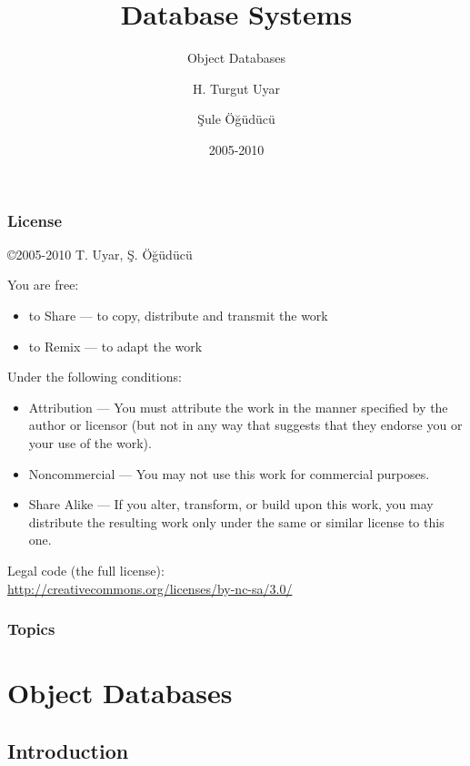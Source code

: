 \documentclass[dvipsnames]{beamer}
\title{Database Systems}
\subtitle{Object Databases}
\author{H. Turgut Uyar \and Şule Öğüdücü}
\date{2005-2010}
\theoremstyle{plain}
\begin{document}
\begin{frame}
  \titlepage
\end{frame}

\begin{frame}
  \frametitle{License}

  \hfill
  \copyright 2005-2010 T. Uyar, Ş. Öğüdücü

  \vfill
  \begin{tiny}
    You are free:
    \begin{itemize}
      \item to Share — to copy, distribute and transmit the work
      \item to Remix — to adapt the work
    \end{itemize}

    Under the following conditions:
    \begin{itemize}
      \item Attribution — You must attribute the work in the manner specified by
        the author or licensor (but not in any way that suggests that they
        endorse you or your use of the work).

      \item Noncommercial — You may not use this work for commercial purposes.

      \item Share Alike — If you alter, transform, or build upon this work, you
        may distribute the resulting work only under the same or similar license
        to this one.
    \end{itemize}
  \end{tiny}

  \vfill
  Legal code (the full license):\\
  \url{http://creativecommons.org/licenses/by-nc-sa/3.0/}
\end{frame}

\begin{frame}
  \frametitle{Topics}
  \tableofcontents
\end{frame}

\section{Object Databases}

\subsection{Introduction}
\end{document}
